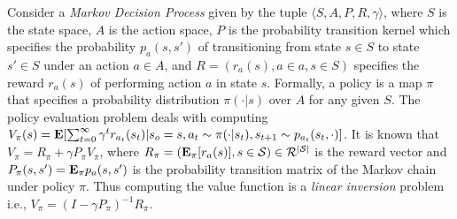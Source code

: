 {\begin{example}
\end{example}
\begin{example}
Consider a \emph{Markov Decision Process} given by the tuple $\langle S,A,P,R,\gamma \rangle$, where $S$ is the state space, $A$ is the action space, $P$ is the probability transition kernel which specifies the probability $p_a(s,s')$ of transitioning from state $s\in S$ to state $s'\in S$ under an action $a\in A$, and $R=(r_a(s),a\in a,s\in S)$ specifies the reward $r_a(s)$ of performing action $a$ in state $s$. Formally, a policy is a map $\pi$ that specifies a probability distribution $\pi(\cdot | s)$ over $A$ for any given $S$. The policy evaluation problem deals with computing $V_\pi(s)=\mathbf{E}[\sum_{t=0}^\infty\gamma^t r_{a_t}(s_t)| s_o=s, a_t\sim\pi(\cdot|s_t), s_{t+1}\sim p_{a_t}(s_t,\cdot)]$. It is known that $V_\pi=R_\pi+\gamma P_\pi V_\pi$, where $R_\pi=(\mathbf{E}_\pi[r_a(s)],s\in\mathcal{S})\in \mathcal{R}^{|\mathcal{S}|}$ is the reward vector and $P_\pi(s,s')=\mathbf{E}_\pi p_a(s,s')$ is the probability transition matrix of the Markov chain under policy $\pi$. Thus computing the value function is a \emph{linear inversion} problem i.e., $V_\pi=(I-\gamma P_\pi)^{-1} R_\pi$.


\end{example}}
